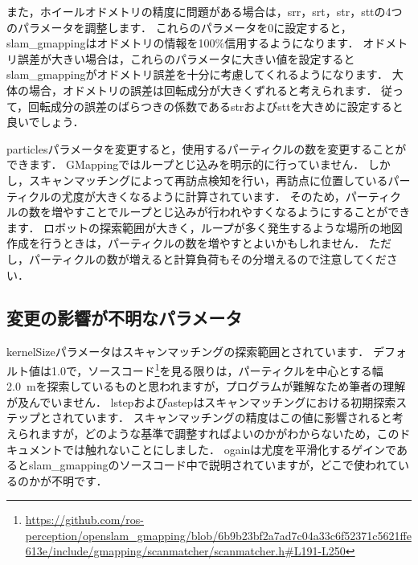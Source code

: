 \documentclass[{../../master}]{subfiles}
\begin{document}
また，ホイールオドメトリの精度に問題がある場合は，\textsf{srr}，\textsf{srt}，\textsf{str}，\textsf{stt}の4つのパラメータを調整します．
これらのパラメータを0に設定すると，\textsf{slam\_gmapping}はオドメトリの情報を100\%信用するようになります．
オドメトリ誤差が大きい場合は，これらのパラメータに大きい値を設定すると\textsf{slam\_gmapping}がオドメトリ誤差を十分に考慮してくれるようになります．
大体の場合，オドメトリの誤差は回転成分が大きくずれると考えられます．
従って，回転成分の誤差のばらつきの係数である\textsf{str}および\textsf{stt}を大きめに設定すると良いでしょう．

\textsf{particles}パラメータを変更すると，使用するパーティクルの数を変更することができます．
GMappingではループとじ込みを明示的に行っていません．
しかし，スキャンマッチングによって再訪点検知を行い，再訪点に位置しているパーティクルの尤度が大きくなるように計算されています．
そのため，パーティクルの数を増やすことでループとじ込みが行われやすくなるようにすることができます．
ロボットの探索範囲が大きく，ループが多く発生するような場所の地図作成を行うときは，パーティクルの数を増やすとよいかもしれません．
ただし，パーティクルの数が増えると計算負荷もその分増えるので注意してください．

\subsection{変更の影響が不明なパラメータ}

\textsf{kernelSize}パラメータはスキャンマッチングの探索範囲とされています．
デフォルト値は1.0で，ソースコード\footnote{\url{https://github.com/ros-perception/openslam_gmapping/blob/6b9b23bf2a7ad7c04a33c6f52371c5621ffe613e/include/gmapping/scanmatcher/scanmatcher.h\#L191-L250}}を見る限りは，パーティクルを中心とする幅\SI{2.0}{m}を探索しているものと思われますが，プログラムが難解なため筆者の理解が及んでいません．
\textsf{lstep}および\textsf{astep}はスキャンマッチングにおける初期探索ステップとされています．
スキャンマッチングの精度はこの値に影響されると考えられますが，どのような基準で調整すればよいのかがわからないため，このドキュメントでは触れないことにしました．
\textsf{ogain}は尤度を平滑化するゲインであると\textsf{slam\_gmapping}のソースコード中で説明されていますが，どこで使われているのかが不明です．
\end{document}

